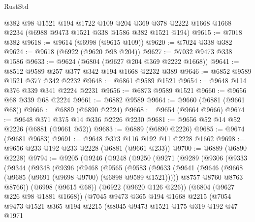 \begin{lexlean}{RustStd}
\begin{coremodule}
    @382
    @98
    @1521
    @194
    @1722
    @109
    @204
    @369
    @378
    @2222
    @1668
    @1668
    @2234
    (@6988 @9473 @1521 @338 @1586 @382 @1521 @194)
@9615 := @7018 @382
@9618 := @9614 (@6998 (@9615 @109))
@9620 := @7024 @338 @382
@9624 := @9618 (@6922 (@9620 @98 @204))
@9627 := @7032 @9473 @338 @1586
@9633 := @9624 (@6804 (@9627 @204 @369 @2222 @1668))
@9641 := @8512 @9589 @257 @377 @342 @194 @1668 @2232 @389
@9646 := @6852 @9589 @1521 @377 @342 @2232
@9648 := @6861 @9589 @1521
@9654 := @9648 @114 @376 @339 @341 @2224 @2231
@9656 := @6873 @9589 @1521
@9660 := @9656 @68 @339 @68 @2224
@9661 := @6882 @9589
@9664 := @9660 (@6881 (@9661 @68))
@9666 := @6889 (@6890 @2224)
@9668 := @9654 (@9664 @9666)
@9674 := @9648 @371 @375 @14 @336 @2226 @2230
@9681 := @9656 @52 @14 @52 @2226 (@6881 (@9661 @52))
@9683 := @6889 (@6890 @2226)
@9685 := @9674 (@9681 @9683)
@9691 := @9648 @373 @116 @192 @11 @2228 @1662
@9698 := @9656 @233 @192 @233 @2228 (@6881 (@9661 @233))
@9700 := @6889 (@6890 @2228)
@9794 := @9205
    (@9246
      (@9248
        (@9250
          (@9271
            (@9289
              (@9306
                (@9333
                  (@9344
                    (@9348
                      (@9396
                        (@9468
                          (@9565
                            (@9583
                              (@9633
                                (@9641
                                  (@9646 (@9668 (@9685 (@9691 (@9698 @9700) (@6898 @9589 @1521)))))
                                  @8757
                                  @8760
                                  @8763
                                  @8766))
                              (@6998 (@9615 @68))
                              (@6922 (@9620 @126 @226))
                              (@6804 (@9627 @226 @98 @1881 @1668))
                              (@7045
                                @9473
                                @365
                                @194
                                @1668
                                @2215
                                (@7054
                                  @9473
                                  @1521
                                  @365
                                  @194
                                  @2215
                                  (@8045
                                    @9473
                                    @1521
                                    @175
                                    @319
                                    @192
                                    @47
                                    @1971

\end{coremodule}
\end{lexlean}
